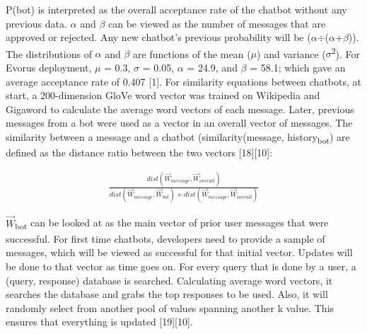 \documentclass[letterpaper, 10 pt, conference]{IEEEtran}
\begin{document}
P(bot) is interpreted as the overall acceptance rate of the chatbot without any previous data. $\alpha$ and $\beta$ can be viewed as the number of messages that are approved or rejected. Any new chatbot's previous probability will be ($\alpha$$\div$($\alpha$+$\beta$)). The distributions of $\alpha$ and $\beta$ are functions of the mean ($\mu$) and variance ($\sigma$\textsuperscript{2}). For Evorus deployment, $\mu$ = 0.3, $\sigma$ = 0.05, $\alpha$ = 24.9, and $\beta$ = 58.1; which gave an average acceptance rate of 0.407 [1]. For similarity equations between chatbots, at start, a 200-dimension GloVe word vector was trained on Wikipedia and Gigaword to calculate the average word vectors of each message. Later, previous messages from a bot were used as a vector in an overall vector of messages. The similarity between a message and a chatbot (similarity(message, history\textsubscript{bot}) are defined as the distance ratio between the two vectors [18][10]:

\begin{equation}
\begin{gathered}
\frac{dist(\overrightarrow{W}_{message}, \overrightarrow{W}_{overall})}{dist(\overrightarrow{W}_{message}, \overrightarrow{W}_{bot}) + dist(\overrightarrow{W}_{message}, \overrightarrow{W}_{overall})}
\end{gathered}
\end{equation}

$\overrightarrow{W}$\textsubscript{bot} can be looked at as the main vector of prior user messages that were successful. For first time chatbots, developers need to provide a sample of messages, which will be viewed as successful for that initial vector. Updates will be done to that vector as time goes on. For every query that is done by a user, a (query, response) database is searched. Calculating average word vectors, it searches the database and grabs the top responses to be used. Also, it will randomly select from another pool of values spanning another k value. This ensures that everything is updated [19][10].
\end{document}
